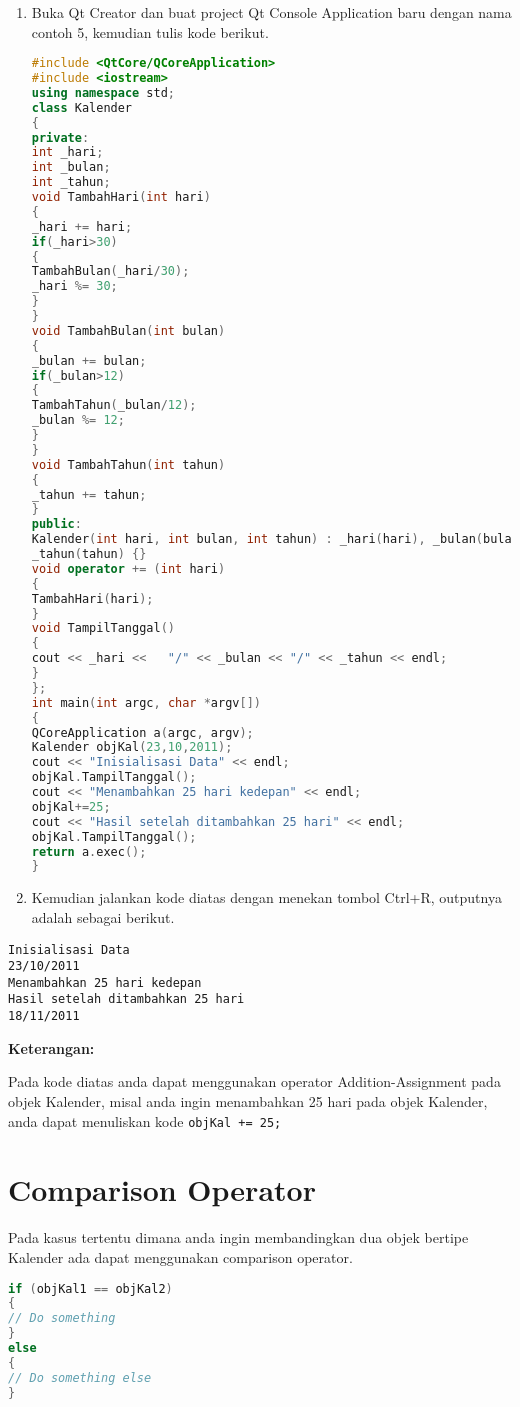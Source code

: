 \begin{enumerate}
\def\labelenumi{\arabic{enumi}.}
\item
  Buka Qt Creator dan buat project Qt Console Application baru dengan
  nama contoh 5, kemudian tulis kode berikut.

\begin{lstlisting}[language=c++]
#include <QtCore/QCoreApplication>
#include <iostream>
using namespace std;
class Kalender
{
private:
int _hari;
int _bulan;
int _tahun;
void TambahHari(int hari)
{
_hari += hari;
if(_hari>30)
{
TambahBulan(_hari/30);
_hari %= 30;
}
}
void TambahBulan(int bulan)
{
_bulan += bulan;
if(_bulan>12)
{
TambahTahun(_bulan/12);
_bulan %= 12;
}
}
void TambahTahun(int tahun)
{
_tahun += tahun;
}
public:
Kalender(int hari, int bulan, int tahun) : _hari(hari), _bulan(bulan),
_tahun(tahun) {}
void operator += (int hari)
{
TambahHari(hari);
}
void TampilTanggal()
{
cout << _hari <<   "/" << _bulan << "/" << _tahun << endl;
}
};
int main(int argc, char *argv[])
{
QCoreApplication a(argc, argv);
Kalender objKal(23,10,2011);
cout << "Inisialisasi Data" << endl;
objKal.TampilTanggal();
cout << "Menambahkan 25 hari kedepan" << endl;
objKal+=25;
cout << "Hasil setelah ditambahkan 25 hari" << endl;
objKal.TampilTanggal();
return a.exec();
}
\end{lstlisting}
\item
  Kemudian jalankan kode diatas dengan menekan tombol Ctrl+R, outputnya
  adalah sebagai berikut.
\end{enumerate}

\begin{verbatim}
Inisialisasi Data
23/10/2011
Menambahkan 25 hari kedepan
Hasil setelah ditambahkan 25 hari
18/11/2011
\end{verbatim}

\textbf{Keterangan:}

Pada kode diatas anda dapat menggunakan operator Addition-Assignment
pada objek Kalender, misal anda ingin menambahkan 25 hari pada objek
Kalender, anda dapat menuliskan kode \texttt{objKal\ +=\ 25;}

\section{Comparison Operator}\label{comparison-operator}

Pada kasus tertentu dimana anda ingin membandingkan dua objek bertipe
Kalender ada dapat menggunakan comparison operator.

\begin{lstlisting}[language=c++]
if (objKal1 == objKal2)
{
// Do something
}
else
{
// Do something else
}
\end{lstlisting}

